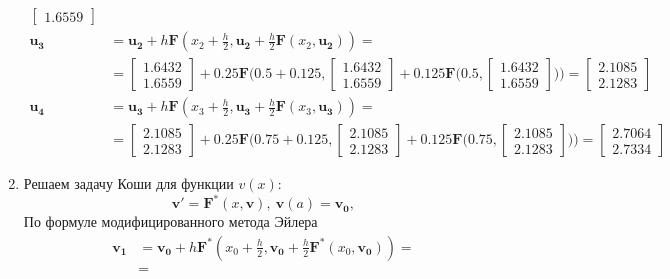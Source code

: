 \documentclass[a4paper, 12pt]{article}
\begin{document}
\begin{enumerate}
\begin{align*}
\begin{bmatrix}
					1.6559
				\end{bmatrix}\\
				\mathbf{u_3}&=\mathbf{u_2} + h\mathbf{F}(x_2 + \frac{h}{2}, \mathbf{u_2}+\frac{h}{2}\mathbf{F}(x_2,\mathbf{u_2}))=\\&=
				\begin{bmatrix}
					1.6432\\
					1.6559
				\end{bmatrix} + 0.25\mathbf{F}\bigg(0.5 + 0.125, 
				\begin{bmatrix}
					1.6432\\
					1.6559
				\end{bmatrix} + 0.125\mathbf{F}\bigg(0.5, 
				\begin{bmatrix}
					1.6432\\
					1.6559
				\end{bmatrix}\bigg)\bigg)=
				\begin{bmatrix}
					2.1085\\
					2.1283
				\end{bmatrix}\\
				\mathbf{u_4}&=\mathbf{u_3} + h\mathbf{F}(x_3 + \frac{h}{2}, \mathbf{u_3}+\frac{h}{2}\mathbf{F}(x_3,\mathbf{u_3}))=\\&=
				\begin{bmatrix}
					2.1085\\
					2.1283
				\end{bmatrix} + 0.25\mathbf{F}\bigg(0.75 + 0.125, 
				\begin{bmatrix}
					2.1085\\
					2.1283
				\end{bmatrix} + 0.125\mathbf{F}\bigg(0.75, 
				\begin{bmatrix}
					2.1085\\
					2.1283
				\end{bmatrix}\bigg)\bigg)=
				\begin{bmatrix}
					2.7064\\
					2.7334
				\end{bmatrix}
			\end{align*}
		\item Решаем задачу Коши для функции $v(x)$:
		\begin{equation*}
			\mathbf{v'}=\mathbf{F^*}(x,\mathbf{v}), \ \mathbf{v}(a)=\mathbf{v_0},
		\end{equation*}
			По формуле модифицированного метода Эйлера
			\begin{align*}
				\mathbf{v_1}&=\mathbf{v_0} + h\mathbf{F^*}(x_0 + \frac{h}{2}, \mathbf{v_0}+\frac{h}{2}\mathbf{F^*}(x_0,\mathbf{v_0}))=\\&=

\end{align*}
\end{enumerate}
\end{document}
